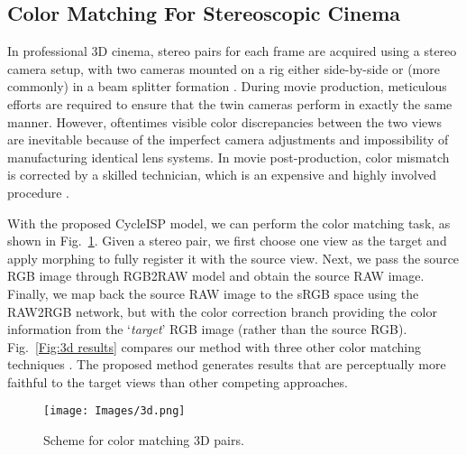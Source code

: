 \documentclass[10pt,twocolumn,letterpaper]{article}
\begin{document}
\subsection{Color Matching For Stereoscopic Cinema}

In professional 3D cinema, stereo pairs for each frame are acquired using a stereo camera setup, with two cameras mounted on a rig either side-by-side or (more commonly) in a beam splitter formation \cite{Bertalmio2014}.
During movie production, meticulous efforts are required to ensure that the twin cameras perform in exactly the same manner. 
However, oftentimes visible color discrepancies between the two views are inevitable because of the imperfect camera adjustments and impossibility of manufacturing identical lens systems. 
In movie post-production, color mismatch is corrected by a skilled technician, which is an expensive and highly involved procedure \cite{mendiburu2009}.  

With the proposed CycleISP model, we can perform the color matching task, as shown in Fig.~\ref{Fig:3d}. 
Given a stereo pair, we first choose one view as the target and
apply morphing to fully register it with the source view. 
Next, we pass the source RGB image through RGB2RAW model and obtain the source RAW image. 
Finally, we map back the source RAW image to the sRGB space using the RAW2RGB network, but with the color correction branch providing the color information from the `\emph{target}' RGB image (rather than the source RGB).
Fig.~\ref{Fig:3d results} compares our method with three other color matching techniques \cite{kotera2005,pitie2007,reinhard2001}. The proposed method generates results that are perceptually more faithful to the target views than other competing approaches.

\begin{figure}[t]
\begin{center}
 \texttt{[image: Images/3d.png]}  
\end{center}\vspace{-1.5em}
    \caption{Scheme for color matching 3D pairs. }\vspace{-1.5mm}
    \label{Fig:3d}
\end{figure}\vspace{-0em}
\end{document}
